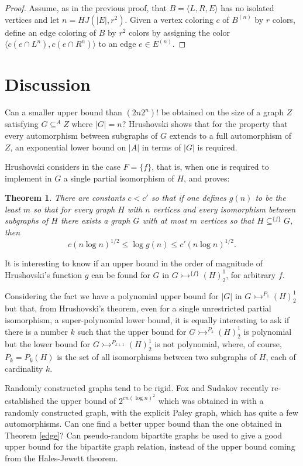\documentclass[11pt]{amsart}
\newcommand{\ars}{\rightarrowtail}
\newcommand{\rng}{\rangle}
\newcommand{\lng}{\langle}
\newcommand{\su}{\subseteq}
\newtheorem*{abstheorem}{Theorem}
\begin{document}
\begin{proof}
  Assume, as in the previous proof, that $B=\lng L,R,E\rng$ has no
  isolated vertices and let $n=HJ(|E|,r^2)$. Given a vertex coloring
  $c$ of $B^{(n)}$ by $r$ colors, define an edge coloring of $B$ by $r^2$
  colors by assigning the color $\lng c(e\cap L^n),c(e\cap R^n)\rng$ to an
  edge $e\in E^{(n)}$.
\end{proof}
 
\section{Discussion}
Can a smaller upper bound than $(2n2^n)!$ be obtained on the size
of a graph $Z$ satisfying $G\su^A Z$ where $|G|=n$?  Hrushovski
\cite{H} shows that for the property that every automorphism
between subgraphs of $G$ extends to a full automorphism of $Z$,
an exponential lower bound on $|A|$ in terms of $|G|$ is required.

Hrushovski considers in \cite{H} the case $F=\{f\}$, that is, when one
is required to implement in $G$ a single partial isomorphism of $H$,
and proves:

\begin{abstheorem} There are constants $c<c'$ so that if one defines
  $g(n)$ to be the least $m$ so that for every graph $H$ with $n$
  vertices and every isomorphism between subgraphs of $H$ there exists
  a graph $G$ with at most $m$ vertices so that $H\su^{\{f\}}G$, then 
\[c(n\log n)^{1/2}\le \log g(n) \le c'(n\log n)^{1/2}.\]
\end{abstheorem}

It is interesting to know if an upper bound in the order of magnitude
of Hrushovski's function $g$ can be found for $G$ in
$G\ars^{\{f\}}(H)^1_2$, for arbitrary $f$. 

Considering the fact we have a polynomial upper bound for $|G|$ in
$G\ars^{P_1}(H)^1_2$ but that, from Hrushovski's theorem, even for a
single unrestricted partial isomorphism, a super-polynomial lower
bound, it is equally interesting to ask if there is
a number $k$ such that the upper bound for $G\ars^{P_k}(H)^1_2$ is
polynomial but the lower bound for $G\ars^{P_{k+1}}(H)^1_2$ is not
polynomial, where, of course, $P_k=P_{k}(H)$ is the set of all
isomorphisms between two subgraphs of $H$, each of cardinality
$k$.

Randomly constructed graphs tend to be rigid. Fox and Sudakov
\cite{FS} recently re-established the upper bound of $2^{cn(\log
  n)^2}$ which was obtained in \cite{KPR} with a randomly constructed
graph, with the explicit Paley graph, which has quite a few
automorphisms.  Can one find a better upper bound than the one
obtained in Theorem \ref{edge}?  Can pseudo-random bipartite graphs be
used to give a good upper bound for the bipartite graph relation,
instead of the upper bound coming from the Hales-Jewett theorem.
\end{document}
